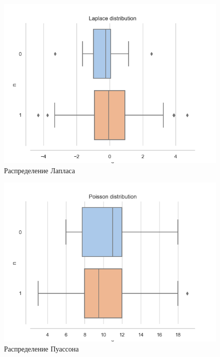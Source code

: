 \documentclass[a4paper,14pt]{article}
\begin{document}
	\begin{figure}[H]
		\centering
		\includegraphics[scale=0.6]{../image/lab3/lab3_laplace.png}
		\caption{Распределение Лапласа}
		\label{fig:laplace}
	\end{figure}
	
	\begin{figure}[H]
		\centering
		\includegraphics[scale=0.6]{../image/lab3/lab3_poisson.png}
		\caption{Распределение Пуассона}
		\label{fig:poisson}
	\end{figure}
	
\end{document}
